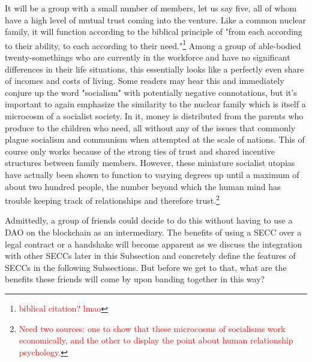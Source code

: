 \documentclass{article}[10pt]
\begin{document}
It will be a group with a small number of members, let us say five, all of whom have a high level of mutual trust coming into the venture.
Like a common nuclear family, it will function according to the biblical principle of "from each according to their ability, to each according to their need."\footnote{
    \textcolor{red}{biblical citation? lmao}}
Among a group of able-bodied twenty-somethings who are currently in the workforce and have no significant differences in their life situations, this essentially looks like a perfectly even share of incomes and costs of living. 
Some readers may hear this and immediately conjure up the word "socialism" with potentially negative connotations, but it's important to again emphasize the similarity to the nuclear family which is itself a microcosm of a socialist society.
In it, money is distributed from the parents who produce to the children who need, all without any of the issues that commonly plague socialism and communism when attempted at the scale of nations.
This of course only works because of the strong ties of trust and shared incentive structures between family members.
However, these miniature socialist utopias have actually been shown to function to varying degrees up until a maximum of about two hundred people, the number beyond which the human mind has trouble keeping track of relationships and therefore trust.\footnote{
    \textcolor{red}{Need two sources: one to show that these microcosms of socialisms work economically, and the other to display the point about human relationship psychology.}} \par 

Admittedly, a group of friends could decide to do this without having to use a DAO on the blockchain as an intermediary.
The benefits of using a SECC over a legal contract or a handshake will become apparent as we discuss the integration with other SECCs later in this Subsection and concretely define the features of SECCs in the following Subsections.
But before we get to that, what are the benefits these friends will come by upon banding together in this way? \par 
\end{document}
